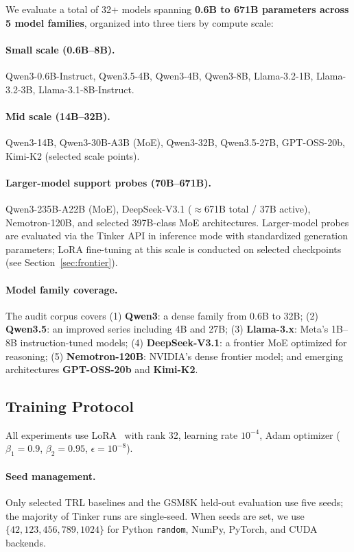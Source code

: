 We evaluate a total of 32+ models spanning \textbf{0.6B to 671B parameters
across 5 model families}, organized into three tiers by compute scale:

\paragraph{Small scale (0.6B--8B).}
Qwen3-0.6B-Instruct, Qwen3.5-4B, Qwen3-4B, Qwen3-8B,
Llama-3.2-1B, Llama-3.2-3B, Llama-3.1-8B-Instruct.

\paragraph{Mid scale (14B--32B).}
Qwen3-14B, Qwen3-30B-A3B (MoE), Qwen3-32B, Qwen3.5-27B,
GPT-OSS-20b, Kimi-K2 (selected scale points).

\paragraph{Larger-model support probes (70B--671B).}
Qwen3-235B-A22B (MoE), DeepSeek-V3.1 ($\approx$671B total / 37B active),
Nemotron-120B, and selected 397B-class MoE architectures.
Larger-model probes are evaluated via the Tinker API in inference mode
with standardized generation parameters; LoRA fine-tuning at this
scale is conducted on selected checkpoints (see Section~\ref{sec:frontier}).

\paragraph{Model family coverage.}
The audit corpus covers (1) \textbf{Qwen3}: a dense family from 0.6B to 32B;
(2) \textbf{Qwen3.5}: an improved series including 4B and 27B;
(3) \textbf{Llama-3.x}: Meta's 1B--8B instruction-tuned models;
(4) \textbf{DeepSeek-V3.1}: a frontier MoE optimized for reasoning;
(5) \textbf{Nemotron-120B}: NVIDIA's dense frontier model;
and emerging architectures \textbf{GPT-OSS-20b} and \textbf{Kimi-K2}.

\subsection{Training Protocol}

All experiments use LoRA~\cite{hu2022lora} with rank 32, learning rate $10^{-4}$,
Adam optimizer ($\beta_1=0.9$, $\beta_2=0.95$, $\epsilon=10^{-8}$).

\paragraph{Seed management.} Only selected TRL baselines and the GSM8K
held-out evaluation use five seeds; the majority of Tinker runs are
single-seed.  When seeds are set, we use
$\{42, 123, 456, 789, 1024\}$ for Python \texttt{random},
NumPy, PyTorch, and CUDA backends.

